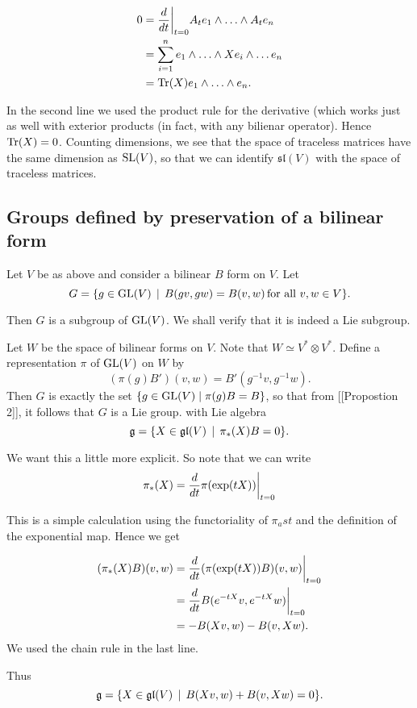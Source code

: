 \documentclass[11pt, english]{article}
\begin{document}
\begin{align*}
0 &= \restr{ \frac{d}{dt}}{t=0} A_t e_1 \wedge \ldots \wedge A_t e_n \\
&= \sum_{i=1}^n e_1 \wedge \ldots \wedge X e_i \wedge \ldots e_n \\
&= \tr(X) e_1 \wedge \ldots \wedge e_n.
\end{align*}

In the second line we used the product rule for the derivative (which works just as well with exterior products (in fact, with any bilienar operator). Hence $\operatorname{Tr}(X)=0$. Counting dimensions, we see that the space of traceless matrices have the same dimension as $\operatorname{SL}(V)$, so that we can identify $\mathfrak{sl}(V)$ with the space of traceless matrices.


\subsection{Groups defined by preservation of a bilinear form}

Let $V$ be as above and consider a bilinear $B$ form on $V$. Let
$$
G = \{ g \in \operatorname{GL}(V) \, \mid  \, B(gv,gw)=B(v,w) \, \text{for all } v,w \in V \}.
$$

Then $G$ is a subgroup of $\operatorname{GL}(V)$. We shall verify that it is indeed a Lie subgroup.

Let $W$ be the space of bilinear forms on $V$. Note that $W \simeq V^\ast \otimes V^\ast$. Define a representation $\pi$ of $\operatorname{GL}(V)$ on $W$ by
$$
(\pi(g)B')(v,w) = B'(g^{-1}v,g^{-1}w).
$$
Then $G$ is exactly the set $\{  g \in \operatorname{GL}(V) \mid \pi(g) B = B \}$, so that from [[Propostion 2]], it follows that $G$ is a Lie group. with Lie algebra
$$
\mathfrak g = \{X \in \mathfrak{gl}(V) \, \mid \, \pi_\ast(X) B = 0 \}.
$$

We want this a little more explicit. So note that we can write
$$
\pi_\ast(X) = \restr{\frac{d}{dt}\pi(\exp(t X)) }{t=0}
$$

This is a simple calculation using the functoriality of $\pi_ast$ and the definition of the exponential map. Hence we get

\begin{align*}
(\pi_\ast(X) B)(v,w) &= \restr{\frac{d}{dt} (\pi(\exp(tX))B)(v,w) }{t=0} \\
&= \restr{\frac{d}{dt}  B(e^{-tX} v, e^{-tX} w)}{t=0} \\
&= -B(Xv,w)-B(v,Xw).
\end{align*}
We used the chain rule in the last line.

Thus
$$
\mathfrak g =  \{X \in \mathfrak{gl}(V) \, \mid \, B(Xv,w)+B(v,Xw) = 0 \}.
$$
\end{document}
